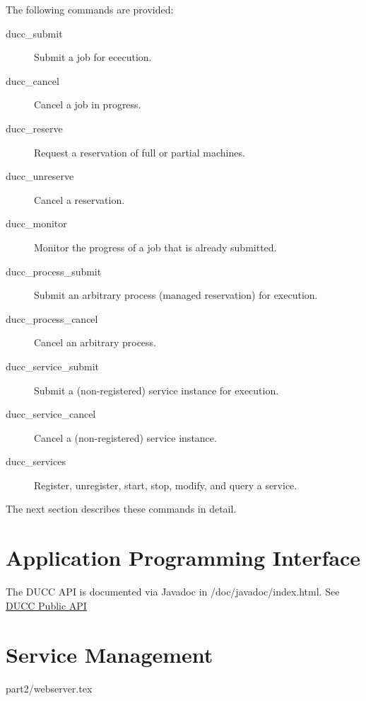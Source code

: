     The following commands are provided:
    \begin{description}
    \item[ducc\_submit] Submit a job for ececution.
    \item[ducc\_cancel] Cancel a job in progress.
    \item[ducc\_reserve] Request a reservation of full or partial machines.
    \item[ducc\_unreserve] Cancel a reservation.
    \item[ducc\_monitor] Monitor the progress of a job that is already submitted.
    \item[ducc\_process\_submit] Submit an arbitrary process (managed reservation) for execution.
    \item[ducc\_process\_cancel] Cancel an arbitrary process.
    \item[ducc\_service\_submit] Submit a (non-registered) service instance for execution.
    \item[ducc\_service\_cancel] Cancel a (non-registered) service instance.
    \item[ducc\_services] Register, unregister, start, stop, modify, and query a service.
    \end{description}
    
    The next section describes these commands in detail.

    
    
    
    
    
    
    
    
    
    
    


\chapter{Application Programming  Interface}
\label{chap:api}
   \ifpdf
      The DUCC API is documented via Javadoc in \ducchome/doc/javadoc/index.html.
   \else
      See \href{javadoc/index.html}{DUCC Public API}
   \fi
\chapter{Service Management}
\label{chap:services}




 {part2/webserver.tex}

